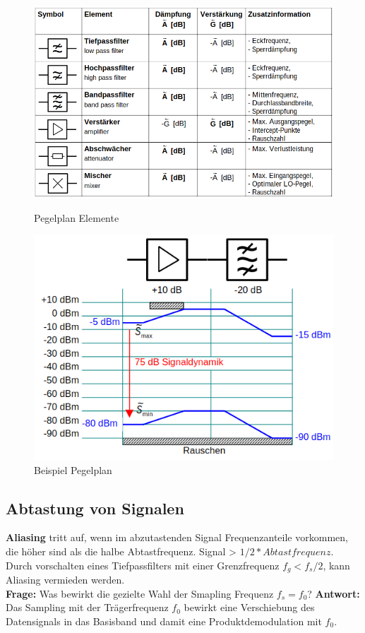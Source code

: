 \begin{figure}[h!]
	\centering
	\begin{minipage}[t]{0.8\textwidth}
		\centering
		\includegraphics[width=0.9\linewidth]{images/pegelplan_elemente}
		\caption{Pegelplan Elemente}
		\label{fig:pegelplanelemente}
	\end{minipage}
	\begin{minipage}[t]{0.8\textwidth}
		\centering
		\includegraphics[width=0.9\linewidth]{images/pegelplan_beispiel}
		\caption{Beispiel Pegelplan}
		\label{fig:pegelplanbeispiel}
	\end{minipage}
\end{figure}
\clearpage

\subsection{Abtastung von Signalen}
\textbf{Aliasing} tritt auf, wenn im abzutastenden Signal Frequenzanteile vorkommen, die höher sind als die halbe Abtastfrequenz. Signal > $1/2*Abtastfrequenz$. Durch vorschalten eines Tiefpassfilters mit einer Grenzfrequenz $f_g<f_s/2$, kann Aliasing vermieden werden.
\\
\textbf{Frage:} Was bewirkt die gezielte Wahl der Smapling Frequenz $f_s=f_0$?
\textbf{Antwort:} Das Sampling mit der Trägerfrequenz $f_0$ bewirkt eine Verschiebung des Datensignals in das Basisband und damit eine Produktdemodulation mit $f_0$.

